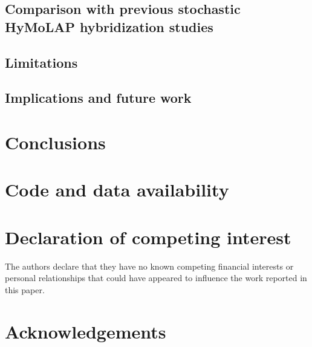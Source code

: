 \documentclass[preprint,12pt]{elsarticle}
\begin{document}
\subsection{Comparison with previous stochastic HyMoLAP hybridization studies}

\subsection{Limitations}

\subsection{Implications and future work}

\section{Conclusions}

\section*{Code and data availability}

\section*{Declaration of competing interest}
The authors declare that they have no known competing financial interests or personal relationships that could have appeared to influence the work reported in this paper.

\section*{Acknowledgements}



\end{document}
